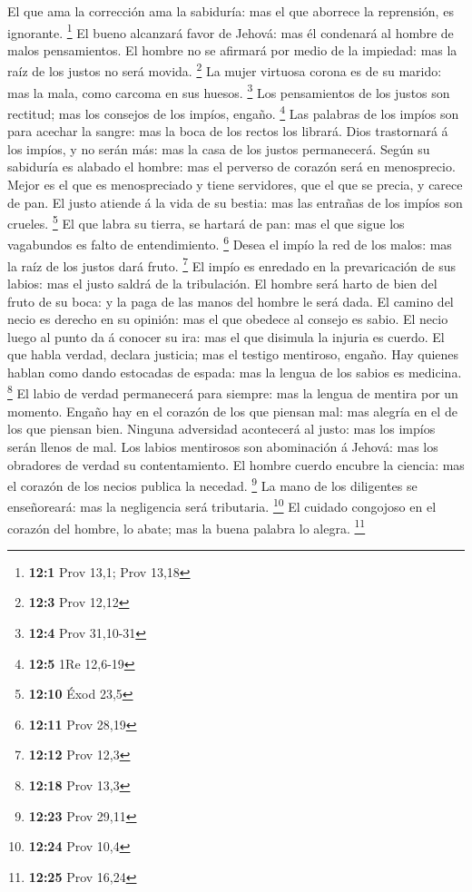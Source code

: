  El que ama la corrección ama la sabiduría: mas el que
aborrece la reprensión, es ignorante. \footnote{\textbf{12:1} Prov 13,1;
  Prov 13,18}  El bueno alcanzará favor de Jehová: mas él
condenará al hombre de malos pensamientos.  El hombre no se
afirmará por medio de la impiedad: mas la raíz de los justos no será
movida. \footnote{\textbf{12:3} Prov 12,12}  La mujer
virtuosa corona es de su marido: mas la mala, como carcoma en sus
huesos. \footnote{\textbf{12:4} Prov 31,10-31}  Los
pensamientos de los justos son rectitud; mas los consejos de los impíos,
engaño. \footnote{\textbf{12:5} 1Re 12,6-19}  Las palabras
de los impíos son para acechar la sangre: mas la boca de los rectos los
librará.  Dios trastornará á los impíos, y no serán más: mas
la casa de los justos permanecerá.  Según su sabiduría es
alabado el hombre: mas el perverso de corazón será en menosprecio.
 Mejor es el que es menospreciado y tiene servidores, que el
que se precia, y carece de pan.  El justo atiende á la vida
de su bestia: mas las entrañas de los impíos son crueles. \footnote{\textbf{12:10}
  Éxod 23,5}  El que labra su tierra, se hartará de pan:
mas el que sigue los vagabundos es falto de entendimiento. \footnote{\textbf{12:11}
  Prov 28,19}  Desea el impío la red de los malos: mas la
raíz de los justos dará fruto. \footnote{\textbf{12:12} Prov 12,3}
 El impío es enredado en la prevaricación de sus labios:
mas el justo saldrá de la tribulación.  El hombre será
harto de bien del fruto de su boca: y la paga de las manos del hombre le
será dada.  El camino del necio es derecho en su opinión:
mas el que obedece al consejo es sabio.  El necio luego al
punto da á conocer su ira: mas el que disimula la injuria es cuerdo.
 El que habla verdad, declara justicia; mas el testigo
mentiroso, engaño.  Hay quienes hablan como dando estocadas
de espada: mas la lengua de los sabios es medicina. \footnote{\textbf{12:18}
  Prov 13,3}  El labio de verdad permanecerá para siempre:
mas la lengua de mentira por un momento.  Engaño hay en el
corazón de los que piensan mal: mas alegría en el de los que piensan
bien.  Ninguna adversidad acontecerá al justo: mas los
impíos serán llenos de mal.  Los labios mentirosos son
abominación á Jehová: mas los obradores de verdad su contentamiento.
 El hombre cuerdo encubre la ciencia: mas el corazón de los
necios publica la necedad. \footnote{\textbf{12:23} Prov 29,11}
 La mano de los diligentes se enseñoreará: mas la
negligencia será tributaria. \footnote{\textbf{12:24} Prov 10,4}
 El cuidado congojoso en el corazón del hombre, lo abate;
mas la buena palabra lo alegra. \footnote{\textbf{12:25} Prov 16,24}

